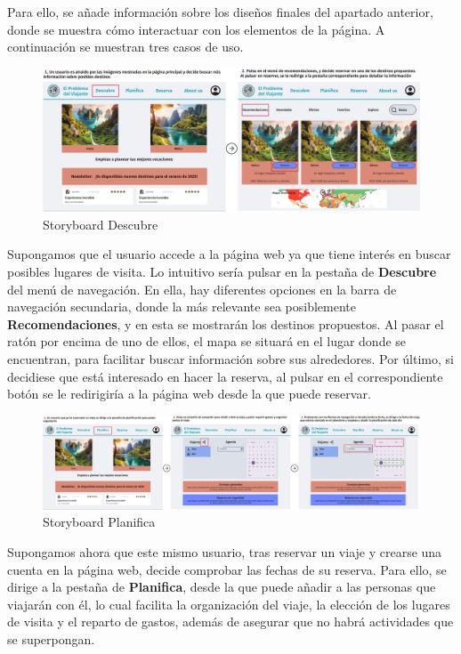 \documentclass[11pt, a4paper]{book}
\begin{document}
	Para ello, se añade información sobre los diseños finales del apartado anterior, donde se muestra cómo interactuar con los elementos de la página. A continuación se muestran tres casos de uso.
	
	\begin{figure} [H]
		\centering
		\includegraphics[width=\textwidth]{storyboard-descubrir.png}
		\caption{Storyboard Descubre}
	\end{figure}

	Supongamos que el usuario accede a la página web ya que tiene interés en buscar posibles lugares de visita. Lo intuitivo sería pulsar en la pestaña de \textbf{Descubre} del menú de navegación. En ella, hay diferentes opciones en la barra de navegación secundaria, donde la más relevante sea posiblemente \textbf{Recomendaciones}, y en esta se mostrarán los destinos propuestos. Al pasar el ratón por encima de uno de ellos, el mapa se situará en el lugar donde se encuentran, para facilitar buscar información sobre sus alrededores. Por último, si decidiese que está interesado en hacer la reserva, al pulsar en el correspondiente botón se le redirigiría a la página web desde la que puede reservar.

	\begin{figure} [H]
		\centering
		\includegraphics[width=\textwidth]{storyboard-planificar.png}
		\caption{Storyboard Planifica}
	\end{figure}
	
	Supongamos ahora que este mismo usuario, tras reservar un viaje y crearse una cuenta en la página web, decide comprobar las fechas de su reserva. Para ello, se dirige a la pestaña de \textbf{Planifica}, desde la que puede añadir a las personas que viajarán con él, lo cual facilita la organización del viaje, la elección de los lugares de visita y el reparto de gastos, además de asegurar que no habrá actividades que se superpongan.
	
\end{document}
